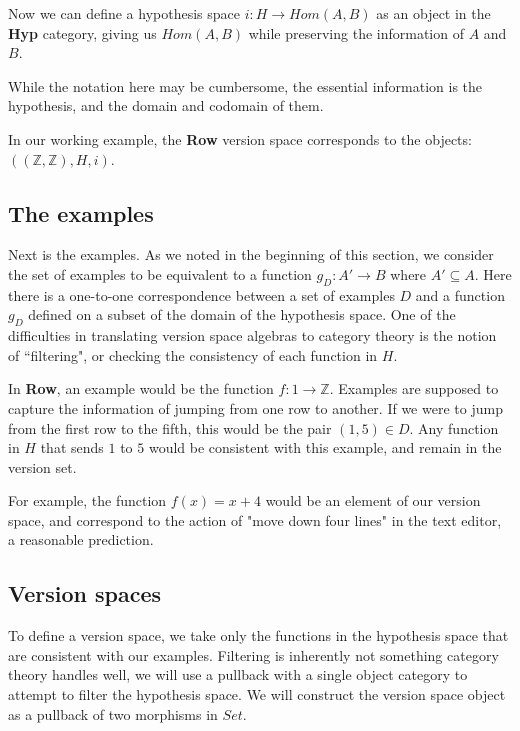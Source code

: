 \documentclass{article}
\theoremstyle{definition}
\begin{document}
Now we can define a hypothesis space $i:H\rightarrow Hom(A,B)$ as an object in the \textbf{Hyp} category, giving us $Hom(A,B)$ while preserving the information of $A$ and $B$.

While the notation here may be cumbersome, the essential information is the hypothesis, and the domain and codomain of them.    

In our working example, the \textbf{Row} version space corresponds to the objects: $((\mathbb{Z}, \mathbb{Z}), H, i)$. 


\subsection{The examples}
Next is the examples. As we noted in the beginning of this section, we consider the set of examples to be equivalent to a function $g_D: A' \rightarrow B$ where $A' \subseteq A$.  Here there is a one-to-one correspondence between a set of examples $D$ and a function $g_D$ defined on a subset of the domain of the hypothesis space. One of the difficulties in translating version space algebras to category theory is the notion of ``filtering", or checking the consistency of each function in $H$. 


In \textbf{Row}, an example would be the function $f: {1} \rightarrow \mathbb{Z}$. Examples are supposed to capture the information of jumping from one row to another. If we were to jump from the first row to the fifth, this would be the pair $(1,5)\in D$. Any function in $H$ that sends $1$ to $5$ would be consistent with this example, and remain in the version set. 

For example, the function $f(x) = x + 4$ would be an element of our version space, and correspond to the action of "move down four lines" in the text editor, a reasonable prediction. 

\subsection{Version spaces}
To define a version space, we take only the functions in the hypothesis space that are consistent with our examples. Filtering is inherently not something category theory handles well, we will use a pullback with a single object category to attempt to filter the hypothesis space. We will construct the version space object as a pullback of two morphisms in $Set$. 
\end{document}
